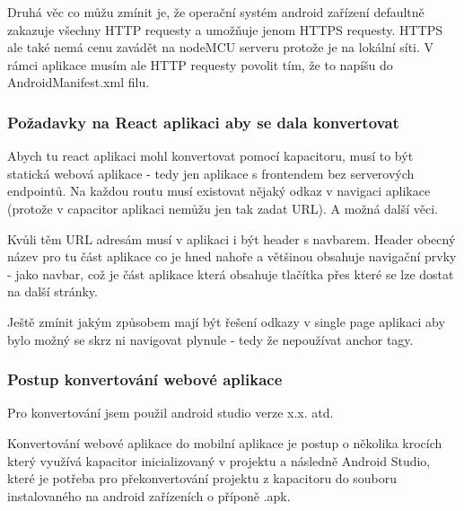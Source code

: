 Druhá věc co můžu zmínit je, že operační systém android zařízení defaultně zakazuje všechny HTTP requesty a umožňuje jenom HTTPS requesty. HTTPS ale také nemá cenu zavádět na nodeMCU serveru protože je na lokální síti. V rámci aplikace musím ale HTTP requesty povolit tím, že to napíšu do AndroidManifest.xml filu.


\subsubsection{Požadavky na React aplikaci aby se dala konvertovat}\label{sec:PozadavkyNaReactAplikaceAbySeDalaKonvertovat}

Abych tu react aplikaci mohl konvertovat pomocí kapacitoru, musí to být statická webová aplikace - tedy jen aplikace s frontendem bez serverových endpointů. Na každou routu musí existovat nějaký odkaz v navigaci aplikace (protože v capacitor aplikaci nemůžu jen tak zadat URL). A možná další věci.

Kvůli těm URL adresám musí v aplikaci i být header s navbarem. Header obecný název pro tu část aplikace co je hned nahoře a většinou obsahuje navigační prvky - jako navbar, což je část aplikace která obsahuje tlačítka přes které se lze dostat na další stránky.

Ještě zmínit jakým způsobem mají být řešení odkazy v single page aplikaci aby bylo možný se skrz ni navigovat plynule - tedy že nepoužívat anchor tagy.


\subsubsection{Postup konvertování webové aplikace}

Pro konvertování jsem použil android studio verze x.x. atd.

Konvertování webové aplikace do mobilní aplikace je postup o několika krocích který využívá kapacitor inicializovaný v projektu a následně Android Studio, které je potřeba pro překonvertování projektu z kapacitoru do souboru instalovaného na android zařízeních o příponě .apk.

